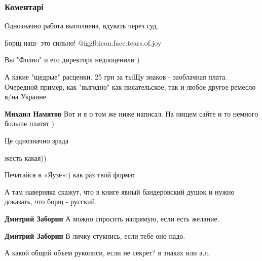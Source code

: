  
 
 
 
 
\subsubsection{Коментарі}
\label{sec:16_07_2021.fb.zaborin_dmitrij.1.kniga_pro_borsch_zapret.cmt}

\begin{itemize} %
Однозначно работа выполнена, вдувать через суд.

Борщ наш- это сильно!  @igg{fbicon.face.tears.of.joy} 

Вы "Фолио" и его директора недооценили )

А какие "щедрые" расценки. 25 грн за тыЩу знаков - заоблачная плата. Очередной пример, как "выгодно" как писательское, так и любое другое ремесло в/на Украине.

\begin{itemize} %
\textbf{Михаил Намятов} Вот и я о том же ниже написал. На нищем сайте и то немного больше платят )
\end{itemize} %

Це однозначно зрада

жесть какая))


Печатайся в «Яузе»:) как раз твой формат

\begin{itemize} %
А там наверняка скажут, что в книге явный бандеровский душок и нужно доказать, что борщ - русский.

\textbf{Дмитрий Заборин} А можно спросить напрямую, если есть желание.

\textbf{Дмитрий Заборин} В личку стукнись, если тебе оно надо.
\end{itemize} %

А какой общий объем рукописи, если не секрет? в знаках или а.л.


\end{itemize}
